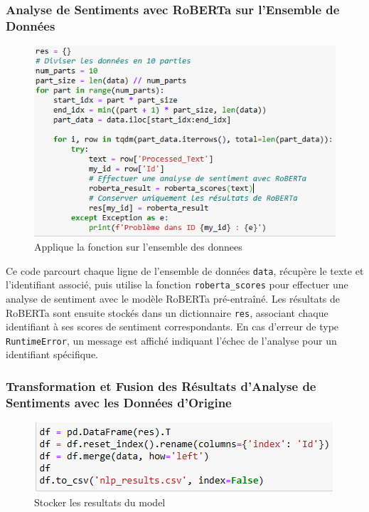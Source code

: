 \subsubsection{Analyse de Sentiments avec RoBERTa sur l'Ensemble de Données}

\begin{figure}[h]
    \centering
    \includegraphics[scale=0.7]{assets/RobertaForAllData.PNG}
    \caption{Applique la fonction sur l'ensemble des donnees}
    \label{fig:applyfunforalldata}
\end{figure}

Ce code parcourt chaque ligne de l'ensemble de données \texttt{data}, récupère le texte et l'identifiant associé, puis utilise la fonction \texttt{roberta\_scores} pour effectuer une analyse de sentiment avec le modèle RoBERTa pré-entraîné. Les résultats de RoBERTa sont ensuite stockés dans un dictionnaire \texttt{res}, associant chaque identifiant à ses scores de sentiment correspondants. En cas d'erreur de type \texttt{RuntimeError}, un message est affiché indiquant l'échec de l'analyse pour un identifiant spécifique.


\subsubsection{Transformation et Fusion des Résultats d'Analyse de Sentiments avec les Données d'Origine}

\begin{figure}[h]
    \centering
    \includegraphics[scale=0.7]{assets/storerobertaresults.PNG}
    \caption{Stocker les resultats du model}
    \label{fig:stockrobertaresults}
\end{figure}

